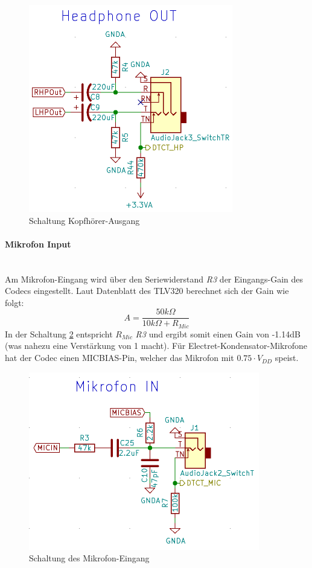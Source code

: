 \begin{figure} [H]
\begin{center}
 \includegraphics[scale=0.6]{../graphics/Schema_HPOUT.png}
 \caption{Schaltung Kopfhörer-Ausgang}
\label{fig:Schema_HPOUT}
\end{center}
\end{figure}
\newpage
\paragraph{Mikrofon Input}\vspace{-0.3cm}\\
\label{par:MicIN}
Am Mikrofon-Eingang wird über den Seriewiderstand \textit{R3} der Eingangs-Gain des Codecs eingestellt. Laut Datenblatt des TLV320 \cite{tlv320} berechnet sich der Gain wie folgt:
\begin{equation}
A=\frac{50k\Omega}{10k\Omega+R_{Mic}}
\end{equation}
In der Schaltung \ref{fig:Schema_MicIN} entspricht $R_{Mic}$ \textit{R3} und ergibt somit einen Gain von -1.14dB (was nahezu eine Verstärkung von 1 macht).
Für Electret-Kondensator-Mikrofone hat der Codec einen MICBIAS-Pin, welcher das Mikrofon mit $0.75\cdot V_{DD}$ speist.
\begin{figure} [H]
\begin{center}
\includegraphics[scale=0.6]{../graphics/Schema_MicIN.png}
\caption{Schaltung des Mikrofon-Eingang}
\label{fig:Schema_MicIN}
\end{center}
\end{figure}

